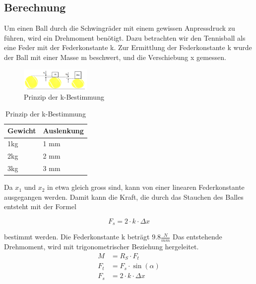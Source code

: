 \subsection{Berechnung}
Um einen Ball durch die Schwingräder mit einem gewissen Anpressdruck zu führen, wird ein
Drehmoment benötigt. Dazu betrachten wir den Tennisball als eine Feder mit der Federkonstante k. Zur Ermittlung der Federkonstante k wurde der Ball mit einer Masse m
beschwert, und die Verschiebung x gemessen.

\begin{figure}[h!]
	\centering
	\includegraphics[width=0.3\textwidth]{Enddokumentation/Anhang/Bilder/KompressionBaelle.png}
	\caption{Prinzip der k-Bestimmung}
	\label{fig:BallKomp}
\end{figure}

\begin{table}[h!]
	\begin{tabular}{p{1.5cm}p{1.7cm}}
		Gewicht & Auslenkung\\
		\hline
		1kg & 1 mm\\
		2kg & 2 mm\\
		3kg & 3 mm\\
	\end{tabular}
	\centering
	\caption{Prinzip der k-Bestimmung}
	\label{tab:BallKompErgebnis}
\end{table}

Da $x_1$ und $x_2$ in etwa gleich gross sind, kann von einer linearen Federkonstante
ausgegangen werden. Damit kann die Kraft, die durch das Stauchen des Balles entsteht mit der
Formel

\begin{equation}  
    F_s=2\cdot k \cdot \Delta x 
\end{equation}

bestimmt werden. Die Federkonstante k beträgt $9.8\frac{N}{mm}$ Das entstehende Drehmoment,
wird mit trigonometrischer Beziehung hergeleitet.
\begin{align}  
    \label{equ:Formel_M} %
    M &= R_S \cdot F_t\\
    F_t &= F_s \cdot \sin(\alpha)\\ 
    F_s &= 2\cdot k \cdot \Delta x 
\end{align}

